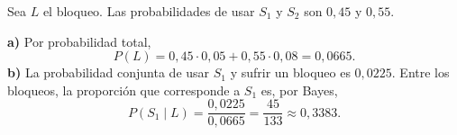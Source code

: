 Sea $L$ el bloqueo. Las probabilidades de usar $S_1$ y $S_2$ son $0{,}45$ y $0{,}55$.

\textbf{a)} Por probabilidad total,
\[
P(L)=0{,}45\cdot0{,}05+0{,}55\cdot0{,}08=\boxed{0{,}0665}.
\]
\textbf{b)} La probabilidad conjunta de usar $S_1$ y sufrir un bloqueo es $0{,}0225$. Entre los bloqueos, la proporción que corresponde a $S_1$ es, por Bayes,
\[
P(S_1\mid L)=\frac{0{,}0225}{0{,}0665}=\frac{45}{133}\approx\boxed{0{,}3383}.
\]
